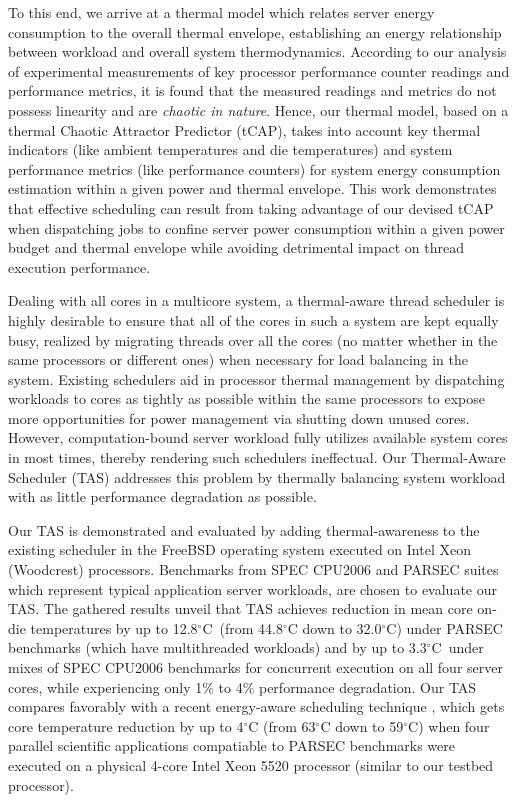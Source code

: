 \documentclass[times, 10pt,twocolumn]{IEEEtran}
\begin{document}
To this end, we arrive at a thermal model which relates server energy
consumption to the overall thermal envelope, establishing an energy
relationship between workload and overall system thermodynamics.
According to our analysis of experimental measurements of key processor
performance counter readings and performance metrics, it is found that
the measured readings and metrics do not possess linearity and are
\textit{chaotic in nature}.  Hence, our thermal model, based on a
thermal Chaotic Attractor Predictor (tCAP), takes into account key
thermal indicators (like ambient temperatures and die temperatures) and
system performance metrics (like performance counters) for system energy
consumption estimation within a given power and thermal envelope.  This
work demonstrates that effective scheduling can result from taking
advantage of our devised tCAP when dispatching jobs to confine server
power consumption within a given power budget and thermal envelope while
avoiding detrimental impact on thread execution performance.

Dealing with all cores in a multicore system, a thermal-aware thread
scheduler is highly desirable to ensure that all of the cores in such a
system are kept equally busy, realized by migrating threads over all the
cores (no matter whether in the same processors or different ones) when
necessary for load balancing in the system.  Existing schedulers aid in
processor thermal management by dispatching workloads to cores as
tightly as possible within the same processors to expose more
opportunities for power management via shutting down unused cores.
However, computation-bound server workload fully utilizes available
system cores in most times, thereby rendering such schedulers
ineffectual.  Our Thermal-Aware Scheduler (TAS) addresses this problem
by thermally balancing system workload with as little performance
degradation as possible.  

Our TAS is demonstrated and evaluated by adding thermal-awareness to the
existing scheduler in the FreeBSD operating system executed on Intel
Xeon (Woodcrest) processors.  Benchmarks from SPEC CPU2006 and PARSEC
suites which represent typical application server workloads, are chosen
to evaluate our TAS.  The gathered results unveil that TAS achieves
reduction in mean core on-die temperatures by up to 12.8$^{\circ}$C\ 
(from 44.8$^\circ$C down to 32.0$^\circ$C) under
PARSEC benchmarks (which have multithreaded workloads) and by up to
3.3$^{\circ}$C\ under mixes of SPEC CPU2006 benchmarks for concurrent
execution on all four server cores, while experiencing only 1\% to 4\%
performance degradation.  Our TAS compares favorably with a recent
energy-aware scheduling technique \cite{Sarood2011}, 
which gets core temperature reduction
by up to 4$^\circ$C (from 63$^\circ$C down to 59$^\circ$C) when four parallel
scientific applications compatiable to PARSEC benchmarks 
were executed on a physical
4-core Intel Xeon 5520 processor (similar to our testbed processor).
\end{document}

